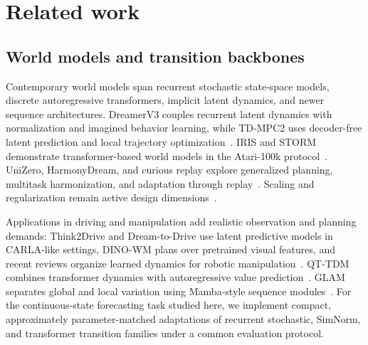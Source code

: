 \section{Related work}

\subsection{World models and transition backbones}

Contemporary world models span recurrent stochastic state-space models, discrete autoregressive transformers, implicit latent dynamics, and newer sequence architectures. DreamerV3 couples recurrent latent dynamics with normalization and imagined behavior learning, while TD-MPC2 uses decoder-free latent prediction and local trajectory optimization~\cite{hafner2025_mastering_diverse_control_tasks_through,hansen2023_td_mpc2_scalable_robust_world}. IRIS and STORM demonstrate transformer-based world models in the Atari-100k protocol~\cite{micheli2022_transformers_are_sample_efficient_world,zhang2023_storm_efficient_stochastic_transformer_based}. UniZero, HarmonyDream, and curious replay explore generalized planning, multitask harmonization, and adaptation through replay~\cite{pu2024_unizero_generalized_and_efficient_planning,ma2023_harmonydream_task_harmonization_inside_world,kauvar2023_curious_replay_for_model_based}. Scaling and regularization remain active design dimensions~\cite{nauman2024_bigger_regularized_optimistic_scaling_for}.

Applications in driving and manipulation add realistic observation and planning demands: Think2Drive and Dream-to-Drive use latent predictive models in CARLA-like settings, DINO-WM plans over pretrained visual features, and recent reviews organize learned dynamics for robotic manipulation~\cite{li2024_think2drive_efficient_reinforcement_learning_by,gao2024_dream_to_drive_with_predictive,zhou2024_dino_wm_world_models_on,ai2025_a_review_of_learning_based}. QT-TDM combines transformer dynamics with autoregressive value prediction~\cite{kotb2024_qt_tdm_planning_with_transformer}. GLAM separates global and local variation using Mamba-style sequence modules~\cite{he2025_glam_global_local_variation_awareness}. For the continuous-state forecasting task studied here, we implement compact, approximately parameter-matched adaptations of recurrent stochastic, SimNorm, and transformer transition families under a common evaluation protocol.

